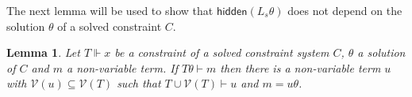 \documentclass[acmtocl,acmnow]{acmtrans2m}
\newtheorem{lemma}[theorem]{Lemma}
\newcommand{\comment}[1]{}
\newcommand{\var}{\mathcal{V}}
\newcommand{\lleft}[1]{\mathsf{lhs}(#1)}
\newcommand{\HK}{K}
\newcommand{\simple}{partial}
\newcommand{\keys}{\mathsf{Key}}
\newcommand{\lset}[1]{#1_s}
\newcommand{\hidden}[1]{\mathsf{hidden}({#1})}
\begin{document}
\comment{Let  $C$ be a solved constraint system, $theta$ be a {\simple} solution of $C$ and $L$ be a list of
messages
such that $\var(\lset{L})\subseteq\var(C)$ and $\lleft{C}\subseteq \lset{L}$. Also let $\HK$ be a set of
names of sort $\keys$.  Let $\le$ be a partial ordering on $\HK$. If there is $k\in\HK$ such that $k$ is
deducible, that is $\lleft{C}\theta\vdash k$ then the predicates $P_{kc}^{\HK}$ and
$\overline{P}_{\le}({\HK})$ hold. If all the keys in $\HK$ are not deducible then $P_{kc}^{\HK}$ holds on
$L\theta$ if and only if
}


The next lemma will be used to show that $\hidden{\lset{L}\theta}$ does not
depend on the 
solution $\theta$ of a solved constraint $C$.
\begin{lemma}\label{lem:similar_deduc}
Let $T\Vdash x$ be a constraint of a solved constraint system $C$,
$\theta$ a  solution of $C$ and $m$ a non-variable term. If $T\theta\vdash m$ then there is a
non-variable term $u$ with $\var(u)\subseteq\var(T)$ such that $T\cup{\var(T)}\vdash u$ and $m=u\theta$.
\end{lemma}
\end{document}
